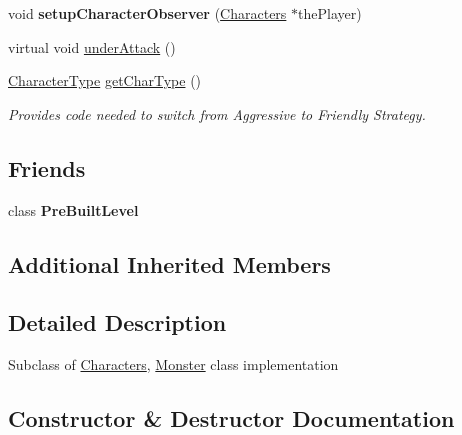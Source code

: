 \begin{DoxyCompactItemize}
\hypertarget{class_monster_a0e5d5c1509f429fc0627403d1b27e157}{}\label{class_monster_a0e5d5c1509f429fc0627403d1b27e157} 
void {\bfseries setup\+Character\+Observer} (\hyperlink{class_characters}{Characters} $\ast$the\+Player)
\item 
virtual void \hyperlink{class_monster_a217f6f3df7398d65ffea6964931207f2}{under\+Attack} ()
\item 
\hypertarget{class_monster_a9271c8983fe8f58c50d859d60243c8c7}{}\label{class_monster_a9271c8983fe8f58c50d859d60243c8c7} 
\hyperlink{namespaces_8h_ad0cd52c7c9b13be13f9aafebd2e1c860}{Character\+Type} \hyperlink{class_monster_a9271c8983fe8f58c50d859d60243c8c7}{get\+Char\+Type} ()
\begin{DoxyCompactList}\small\item\em Provides code needed to switch from Aggressive to Friendly Strategy. \end{DoxyCompactList}\end{DoxyCompactItemize}
\subsection*{Friends}
\begin{DoxyCompactItemize}
\item 
\hypertarget{class_monster_a2abc12bff809dc7bb630fef5c30199fb}{}\label{class_monster_a2abc12bff809dc7bb630fef5c30199fb} 
class {\bfseries Pre\+Built\+Level}
\end{DoxyCompactItemize}
\subsection*{Additional Inherited Members}


\subsection{Detailed Description}
Subclass of \hyperlink{class_characters}{Characters}, \textquotesingle{}\hyperlink{class_monster}{Monster}\textquotesingle{} class implementation 

\subsection{Constructor \& Destructor Documentation}
\hypertarget{class_monster_ae0c9e6b3fe1421e7a5367e50fa182d93}{}\label{class_monster_ae0c9e6b3fe1421e7a5367e50fa182d93} 
